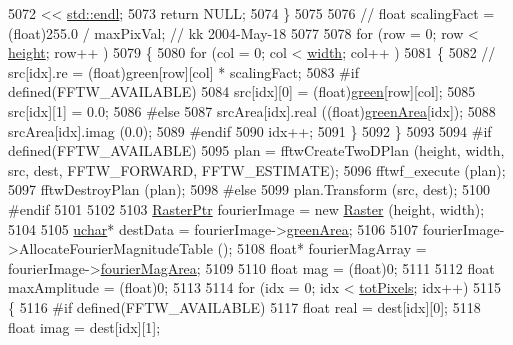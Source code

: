 \begin{DoxyCode}
5072         << \hyperlink{namespace_k_k_b_ad1f50f65af6adc8fa9e6f62d007818a8}{std::endl};
5073     \textcolor{keywordflow}{return} NULL;
5074   \}
5075 
5076   \textcolor{comment}{// float scalingFact = (float)255.0 / maxPixVal;   // kk  2004-May-18}
5077 
5078   \textcolor{keywordflow}{for}  (row = 0; row < \hyperlink{class_k_k_b_1_1_raster_af39ff189de4fbb6de98392e187efafb7}{height}; row++ )
5079   \{
5080     \textcolor{keywordflow}{for} (col = 0; col < \hyperlink{class_k_k_b_1_1_raster_ae0bcc103e191c3421d7692dc69ceb554}{width}; col++ )
5081     \{     
5082       \textcolor{comment}{// src[idx].re = (float)green[row][col] * scalingFact;}
5083 \textcolor{preprocessor}{      #if  defined(FFTW\_AVAILABLE)}
5084         src[idx][0] = (float)\hyperlink{class_k_k_b_1_1_raster_a2d2238911145488e226cd2e34fc8448c}{green}[row][col];
5085         src[idx][1] = 0.0;
5086 \textcolor{preprocessor}{      #else}
5087         srcArea[idx].real ((\textcolor{keywordtype}{float})\hyperlink{class_k_k_b_1_1_raster_ad981258f1f7284a8bd0cd0466f328cdf}{greenArea}[idx]);
5088         srcArea[idx].imag (0.0);
5089 \textcolor{preprocessor}{      #endif}
5090       idx++;
5091     \}
5092   \}
5093   
5094 \textcolor{preprocessor}{  #if  defined(FFTW\_AVAILABLE)}
5095     plan = fftwCreateTwoDPlan (height, width, src, dest, FFTW\_FORWARD, FFTW\_ESTIMATE);
5096     fftwf\_execute (plan);
5097     fftwDestroyPlan (plan);
5098 \textcolor{preprocessor}{  #else}
5099     plan.Transform (src, dest);
5100 \textcolor{preprocessor}{  #endif}
5101 
5102 
5103   \hyperlink{class_k_k_b_1_1_raster}{RasterPtr} fourierImage = \textcolor{keyword}{new} \hyperlink{class_k_k_b_1_1_raster_a19ec88efff547c1fcda863172fef620b}{Raster} (height, width);
5104 
5105   \hyperlink{namespace_k_k_b_ace9969169bf514f9ee6185186949cdf7}{uchar}*  destData = fourierImage->\hyperlink{class_k_k_b_1_1_raster_ad981258f1f7284a8bd0cd0466f328cdf}{greenArea};
5106 
5107   fourierImage->AllocateFourierMagnitudeTable ();
5108   \textcolor{keywordtype}{float}* fourierMagArray = fourierImage->\hyperlink{class_k_k_b_1_1_raster_adc50969a106f5b57aca3a9ce512df0ce}{fourierMagArea};
5109 
5110   \textcolor{keywordtype}{float}  mag = (float)0;
5111 
5112   \textcolor{keywordtype}{float}  maxAmplitude = (float)0;
5113 
5114   \textcolor{keywordflow}{for}  (idx = 0; idx < \hyperlink{class_k_k_b_1_1_raster_a9b08c4a0ca0a35435a478599635f1dc0}{totPixels}; idx++)
5115   \{
5116 \textcolor{preprocessor}{    #if  defined(FFTW\_AVAILABLE)}
5117       \textcolor{keywordtype}{float} real = dest[idx][0];
5118       \textcolor{keywordtype}{float} imag = dest[idx][1];

\end{DoxyCode}
